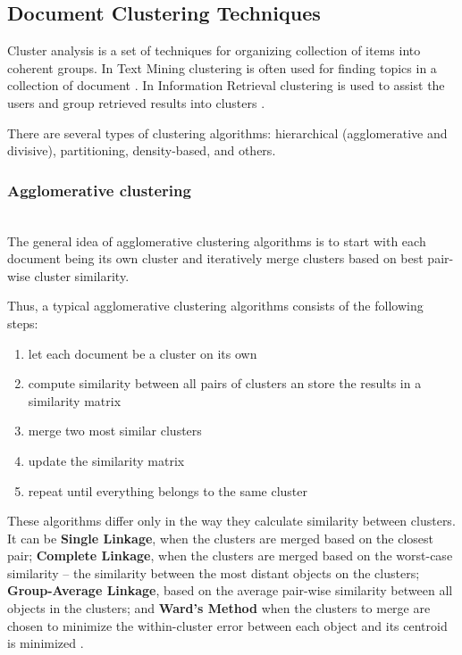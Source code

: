 \subsection{Document Clustering Techniques} \label{sec:doc-clustering}

Cluster analysis is a set of techniques for organizing collection
of items into coherent groups. In Text Mining clustering is often
used for finding topics in a collection of document \cite{aggarwal2012survey}.
In Information Retrieval clustering is used to assist the users and group
retrieved results into clusters \cite{cutting1992scatter}.

There are several types of clustering algorithms:
hierarchical (agglomerative and divisive), partitioning,
density-based, and others.


\subsubsection{Agglomerative clustering} \label{sec:clustering-heierarchical} \ \\

The general idea of agglomerative clustering algorithms is to start with
each document being its own cluster and iteratively merge clusters based
on best pair-wise cluster similarity.

Thus, a typical agglomerative clustering algorithms consists of the following steps:

\begin{enumerate}
\itemsep1pt\parskip0pt
  \item let each document be a cluster on its own
  \item compute similarity between all pairs of clusters an store the
      results in a similarity matrix
  \item merge two most similar clusters
  \item update the similarity matrix
  \item repeat until everything belongs to the same cluster
\end{enumerate}

These algorithms differ only in the way they calculate similarity between
clusters. It can be \textbf{Single Linkage}, when the clusters are merged based
on the closest pair; \textbf{Complete Linkage}, when the clusters are merged
based on the worst-case similarity -- the similarity between the most
distant objects on the clusters; \textbf{Group-Average Linkage}, based
on the average pair-wise similarity between all objects in the clusters;
and \textbf{Ward's Method} when the clusters to merge are chosen to
minimize the within-cluster error between each object and its centroid
is minimized \cite{oikonomakou2005review}.

